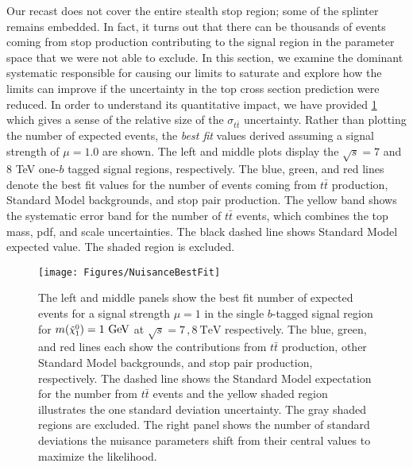 \documentclass[a4paper,12pt]{article}
\newcommand{\tev}{~\text{TeV}}
\newcommand{\gev}{~\text{GeV}}
\def\mnino{\ensuremath{m({\footnotesize \ninoone})}}
\def\ninoone{\ensuremath{\mathchoice%
      {\displaystyle\raise.4ex\hbox{$\displaystyle\tilde\chi^0_1$}}%
         {\textstyle\raise.1ex\hbox{$\textstyle\tilde\chi^0_1$}}%
       {\scriptstyle\raise.3ex\hbox{$\scriptstyle\tilde\chi^0_1$}}%
 {\scriptscriptstyle\raise.3ex\hbox{$\scriptscriptstyle\tilde\chi^0_1$}}}}
\begin{document}
Our recast does not cover the entire stealth stop region; some of the splinter remains embedded.  In fact, it turns out that there can be thousands of events coming from stop production contributing to the signal region in the parameter space that we were not able to exclude. In this section, we examine the dominant systematic responsible for causing our limits to saturate and explore how the limits can improve if the uncertainty in the top cross section prediction were reduced.  In order to understand its quantitative impact, we have provided \cref{fig:NumEvents} which gives a sense of the relative size of the $\sigma_{t\bar{t}}$ uncertainty.
Rather than plotting the number of expected events, the \emph{best fit} values derived assuming a signal strength of $\mu = 1.0$ are shown. The left and middle plots display the $\sqrt{s}=7$ and 8 TeV one-$b$ tagged signal regions, respectively. The blue, green, and red lines denote the best fit values for the number of events coming from $t\bar{t}$ production, Standard Model backgrounds, and stop pair production. The yellow band shows the systematic error band for the number of $t\bar{t}$ events, which combines the top mass, pdf, and scale uncertainties. The black dashed line shows Standard Model expected value. The shaded region is excluded.

\begin{figure}[t]
\begin{center}
\texttt{[image: Figures/NuisanceBestFit]}
\caption{The left and middle panels show the best fit number of expected events for a signal strength $\mu=1$ in the single $b$-tagged signal region for $\mnino =  1\gev$ at $\sqrt{s}=7\,,8\tev$ respectively. The blue, green, and red lines each show the contributions from $t\bar{t}$ production, other Standard Model backgrounds, and stop pair production, respectively. The dashed line shows the Standard Model expectation for the number from $t\bar{t}$ events and the yellow shaded region illustrates the one standard deviation uncertainty. The gray shaded regions are excluded. The right panel shows the number of standard deviations the nuisance parameters shift from their central values to maximize the likelihood.}
\label{fig:NumEvents}
\end{center}
\end{figure}
\end{document}
